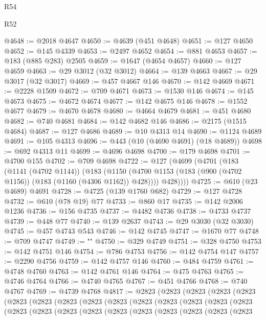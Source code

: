\begin{lexlean}{R54}
\begin{lexlean}{R52}
\begin{coremodule}
{{{{{{{{{{{{{{{{{{{{{{{{{{{{{{{{{{{{{{{{{{{{{{{{{{{{{{{{{{{{{{{{{{{{{{{{{{{{{{{{{{{{{{{{{{{{{{{{{{{{{{{{{{{{{{{{{{{{{{{{{{{{{{{{{{{{{{{{{{{{{{{{{{{{{{{{{{{{{{{{{{{{{{{{{{{{{{{{{{{{{{{{{{{{{{{{{{{{{{@4648 := @2018 @4647
@4650 := @4639 (@451 @4648)
@4651 := @127 @4650
@4652 := @145 @4339
@4653 := @2497 @4652
@4654 := @881 @4653
@4657 := @183 (@885 @283) @2505
@4659 := @1647 (@4654 @4657)
@4660 := @127 @4659
@4663 := @29 @3012 (@32 @3012)
@4664 := @139 @4663
@4667 := @29 @3017 (@32 @3017)
@4669 := @457 @4667 @146
@4670 := @142 @4669
@4671 := @2228 @1509
@4672 := @709 @4671
@4673 := @1530 @146
@4674 := @145 @4673
@4675 := @4672 @4674
@4677 := @142 @4675 @146
@4678 := @1552 @4677
@4679 := @4670 @4678
@4680 := @4664 @4679
@4681 := @451 @4680
@4682 := @740 @4681
@4684 := @142 @4682 @146
@4686 := @2175 (@1515 @4684)
@4687 := @127 @4686
@4689 := @10 @4313 @14
@4690 := @1124 @4689
@4691 := @105 @4313
@4696 := @443 (@10 (@4690 @4691) (@18 @4689))
@4698 := @692 @4313 @11
@4699 := @4696 @4698
@4700 := @179 @4698
@4701 := @4700 @155
@4702 := @709 @4698
@4722 := @127
    (@4699
      (@4701
        (@183
          (@1141 (@4702 @1144))
          (@183
            (@1150 (@4700 @1153 (@183 (@900 (@4702 @1156)) (@183 (@1160 (@4306 @1162)) @428))))
            @428))))
@4725 := @610 (@23 @4689) @4691
@4728 := @4725 (@139 @1760 @682)
@4729 := @127 @4728
@4732 := @610 (@78 @19) @77
@4733 := @860 @17
@4735 := @142 @2006 @1236
@4736 := @156 @4735
@4737 := @4482 @4736
@4738 := @4733 @4737
@4739 := @448 @77
@4740 := @139 @2637
@4743 := @29 @3030 (@32 @3030)
@4745 := @457 @4743 @543
@4746 := @142 @4745
@4747 := @1670 @77
@4748 := @709 @4747
@4749 := "\n"
@4750 := @329 @4749
@4751 := @328 @4750
@4753 := @142 @4751 @146
@4754 := @786 @4753
@4756 := @142 @4754 @147
@4757 := @2290 @4756
@4759 := @142 @4757 @146
@4760 := @484 @4759
@4761 := @4748 @4760
@4763 := @142 @4761 @146
@4764 := @475 @4763
@4765 := @4746 @4764
@4766 := @4740 @4765
@4767 := @451 @4766
@4768 := @740 @4767
@4769 := @4739 @4768
@4817 := @2823
    (@2823
      (@2823
        (@2823
          (@2823
            (@2823
              (@2823
                (@2823
                  (@2823
                    (@2823
                      (@2823
                        (@2823
                          (@2823
                            (@2823
                              (@2823
                                (@2823
                                  (@2823
                                    (@2823
                                      (@2823
                                        (@2823
                                          (@2823
                                            (@2823
                                              (@2823
                                                (@2823
                                                  (@2823
}}}}}}}}}}}}}}}}}}}}}}}}}}}}}}}}}}}}}}}}}}}}}}}}}}}}}}}}}}}}}}}}}}}}}}}}}}}}}}}}}}}}}}}}}}}}}}}}}}}}}}}}}}}}}}}}}}}}}}}}}}}}}}}}}}}}}}}}}}}}}}}}}}}}}}}}}}}}}}}}}}}}}}}}}}}}}}}}}}}}}}}}}}}}}}}}}}}}}}
\end{coremodule}
\end{lexlean}
\end{lexlean}
